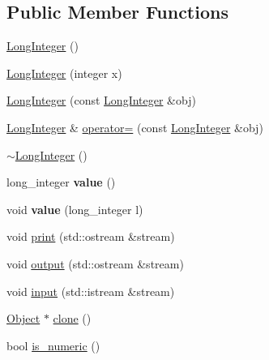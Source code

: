 \subsection*{Public Member Functions}
\begin{DoxyCompactItemize}
\item 
\hyperlink{classez_1_1objects_1_1LongInteger_aabc00d94ae5a2af535316cf674c83965}{Long\+Integer} ()
\item 
\hyperlink{classez_1_1objects_1_1LongInteger_a111bbd17362b965bdfcceea9a7434204}{Long\+Integer} (integer x)
\item 
\hyperlink{classez_1_1objects_1_1LongInteger_a8cfd4cb5790eac3da3d2384f7c91a21d}{Long\+Integer} (const \hyperlink{classez_1_1objects_1_1LongInteger}{Long\+Integer} \&obj)
\item 
\hyperlink{classez_1_1objects_1_1LongInteger}{Long\+Integer} \& \hyperlink{classez_1_1objects_1_1LongInteger_a07b95e96b762d63a4b52fca7e21b8eb2}{operator=} (const \hyperlink{classez_1_1objects_1_1LongInteger}{Long\+Integer} \&obj)
\item 
\hyperlink{classez_1_1objects_1_1LongInteger_af991f863748b4a6a4561c88700235ac0}{$\sim$\+Long\+Integer} ()
\item 
\mbox{\label{classez_1_1objects_1_1LongInteger_a528a1359d086a261f931426f516043f6}} 
long\+\_\+integer {\bfseries value} ()
\item 
\mbox{\label{classez_1_1objects_1_1LongInteger_a6e1b702ff5ce660d9278d5d10d819da5}} 
void {\bfseries value} (long\+\_\+integer l)
\item 
void \hyperlink{classez_1_1objects_1_1LongInteger_a61530e285ac30d7890564a6cbe6bc283}{print} (std\+::ostream \&stream)
\item 
void \hyperlink{classez_1_1objects_1_1LongInteger_a9c4f7a8c3e60ab678b43f818a07540d5}{output} (std\+::ostream \&stream)
\item 
void \hyperlink{classez_1_1objects_1_1LongInteger_a9fa1d50b8d4d7e2ea2383bb625712349}{input} (std\+::istream \&stream)
\item 
\hyperlink{classez_1_1objects_1_1Object}{Object} $\ast$ \hyperlink{classez_1_1objects_1_1LongInteger_af19a10913ba906a81cdb164897edade6}{clone} ()
\item 
bool \hyperlink{classez_1_1objects_1_1LongInteger_ad9241d39b14d6cff1173c692ac37c8fc}{is\+\_\+numeric} ()
\item 

\end{DoxyCompactItemize}
